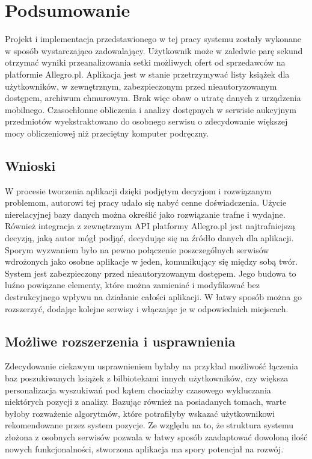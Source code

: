 \chapter{Podsumowanie}
\label{cha:podsumowanie}

Projekt i implementacja przedstawionego w tej pracy systemu zostały wykonane w sposób wystarczająco zadowalający. Użytkownik może w zaledwie parę sekund otrzymać wyniki przeanalizowania setki możliwych ofert od sprzedawców na platformie Allegro.pl. Aplikacja jest w stanie przetrzymywać listy książek dla użytkowników, w zewnętrznym, zabezpieczonym przed nieautoryzowanym dostępem, archiwum chmurowym. Brak więc obaw o utratę danych z urządzenia mobilnego. Czasochłonne obliczenia i analizy dostępnych w serwisie aukcyjnym przedmiotów wyekstraktowano do osobnego serwisu o zdecydowanie większej mocy obliczeniowej niż przeciętny komputer podręczny.

\section{Wnioski}
W procesie tworzenia aplikacji dzięki podjętym decyzjom i rozwiązanym problemom, autorowi tej pracy udało się nabyć cenne doświadczenia. 
Użycie nierelacyjnej bazy danych można określić jako rozwiązanie trafne i wydajne. Również integracja z zewnętrznym API platformy Allegro.pl jest najtrafniejszą decyzją, jaką autor mógł podjąć, decydując się na źródło danych dla aplikacji.
Sporym wyzwaniem było na pewno połączenie poszczególnych serwisów wdrożonych jako osobne aplikacje w jeden, komunikujący się między sobą twór.
System jest zabezpieczony przed nieautoryzowanym dostępem. Jego budowa to luźno powiązane elementy, które można zamieniać i modyfikować bez destrukcyjnego wpływu na działanie całości aplikacji.
W łatwy sposób można go rozszerzyć, dodając kolejne serwisy i włączając je w odpowiednich miejscach.

\section{Możliwe rozszerzenia i usprawnienia}
Zdecydowanie ciekawym usprawnieniem byłaby na przykład możliwość łączenia baz poszukiwanych książek z bilbiotekami innych użytkowników, czy większa personalizacja wyszukiwań pod kątem chociażby czasowego wykluczania niektórych pozycji z analizy.
Bazując również na posiadanych tomach, warte byłoby rozważenie algorytmów, które potrafiłyby wskazać użytkownikowi rekomendowane przez system pozycje.
Ze względu na to, że struktura systemu złożona z osobnych serwisów pozwala w łatwy sposób zaadaptować dowoloną ilość nowych funkcjonalności, stworzona aplikacja ma spory potencjał na rozwój.